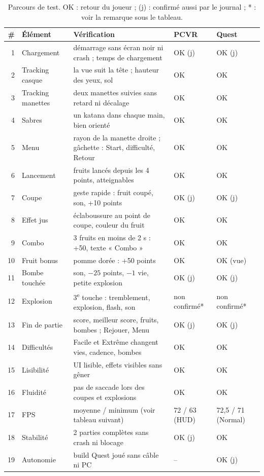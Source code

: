 \documentclass[11pt,a4paper]{article}
\begin{document}
\begin{table}[H]
\centering\small
\caption{Parcours de test. OK : retour du joueur ; (j) : confirmé aussi par le journal ; * : voir la
remarque sous le tableau.}
\begin{tabularx}{\textwidth}{@{}r P{2.6cm} L P{1.9cm} P{2.3cm}@{}}
\toprule
\# & Élément & Vérification & PCVR & Quest \\
 & Chargement & démarrage sans écran noir ni crash ; temps de chargement & OK (j) & OK (j) \\
2 & Tracking casque & la vue suit la tête ; hauteur des yeux, sol & OK & OK \\
3 & Tracking manettes & deux manettes suivies sans retard ni décalage & OK & OK \\
4 & Sabres & un katana dans chaque main, bien orienté & OK & OK \\
5 & Menu & rayon de la manette droite ; gâchette : Start, difficulté, Retour & OK & OK \\
6 & Lancement & fruits lancés depuis les 4 points, atteignables & OK & OK \\
7 & Coupe & geste rapide : fruit coupé, son, +10 points & OK (j) & OK (j) \\
8 & Effet jus & éclaboussure au point de coupe, couleur du fruit & OK & OK \\
9 & Combo & 3 fruits en moins de 2 s : +50, texte « Combo » & OK & OK \\
10 & Fruit bonus & pomme dorée : +50 points & OK & OK (vue) \\
11 & Bombe touchée & son, $-25$ points, $-1$ vie, petite explosion & OK (j) & OK (j) \\
12 & Explosion & 3\textsuperscript{e} touche : tremblement, explosion, flash, son & non confirmé* & non confirmé* \\
13 & Fin de partie & score, meilleur score, fruits, bombes ; Rejouer, Menu & OK (j) & OK (j) \\
14 & Difficultés & Facile et Extrême changent vies, cadence, bombes & OK & OK \\
15 & Lisibilité & UI lisible, effets visibles sans gêner & OK & OK \\
16 & Fluidité & pas de saccade lors des coupes et explosions & OK & OK \\
17 & FPS & moyenne / minimum (voir tableau suivant) & 72 / 63 (HUD) & 72,5 / 71 (Normal) \\
18 & Stabilité & 2 parties complètes sans crash ni blocage & OK (j) & OK \\
19 & Autonomie & build Quest joué sans câble ni PC & -- & OK (j) \\
\bottomrule
\end{tabularx}
\end{table}
\end{document}
